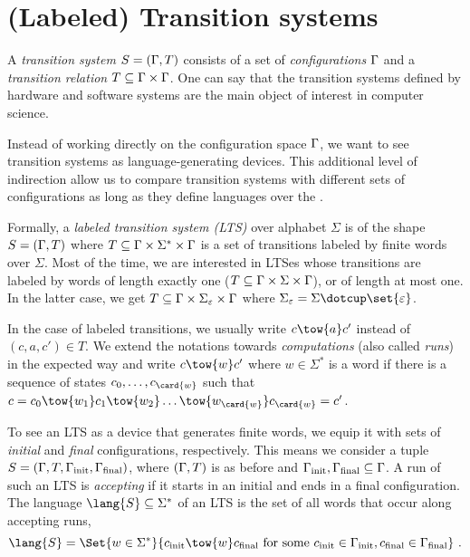 \documentclass[../../diss.tex]{subfiles}
\begin{document}
\section{(Labeled) Transition systems}%
\label{Section:LTS}%

A \emph{transition system} $S = (\Gamma,T)$ consists of a set of \emph{configurations} $\Gamma$ and a \emph{transition relation} $T \subseteq \Gamma \times \Gamma$.
One can say that the transition systems defined by hardware and software systems are the main object of interest in computer science.

Instead of working directly on the configuration space $\Gamma$, we want to see transition systems as language-generating devices.
This additional level of indirection allow us to compare transition systems with different sets of configurations as long as they define languages over the .

Formally, a \emph{labeled transition system (LTS)} over alphabet $\Sigma$ is of the shape $S = (\Gamma,T)$ where $T \subseteq \Gamma \times \Sigma^* \times \Gamma$ is a set of transitions labeled by finite words over $\Sigma$.
Most of the time, we are interested in LTSes whose transitions are labeled by words of length exactly one (\ie $T \subseteq \Gamma \times \Sigma \times \Gamma$), or of length at most one.
In the latter case, we get $T \subseteq \Gamma \times \Sigma_\varepsilon \times \Gamma$ where $\Sigma_\eps = \Sigma \dotcup \set{\eps}$.

In the case of labeled transitions, we usually write $c \tow{a} c'$ instead of $(c,a,c') \in T$.
We extend the notations towards \emph{computations} (also called \emph{runs}) in the expected way and write $c \tow{w} c'$ where $w \in \Sigma^*$ is a word if there is a sequence of states $c_0, \ldots, c_{\card{w}}$ such that $c = c_0 \tow{w_1} c_1 \tow{w_2} \ldots \tow{w_{\card{w}}} c_{\card{w}} = c'$.

To see an LTS as a device that generates finite words, we equip it with sets of \emph{initial} and \emph{final} configurations, respectively.
This means we consider a tuple $S = (\Gamma,T,\Gamma_{\text{init}},\Gamma_{\text{final}})$, where $(\Gamma,T)$ is as before and $\Gamma_{\text{init}}, \Gamma_{\text{final}} \subseteq \Gamma$.
A run of such an LTS is \emph{accepting} if it starts in an initial and ends in a final configuration.
The language $\lang{\lts} \subseteq \Sigma^*$ of an LTS is the set of all words that occur along accepting runs,
\[
    \lang{\lts} = \Set{ w \in \Sigma^*}{c_\init \tow{w} c_\final \text{ for some } c_\init \in \configs_\init, c_\final \in \configs_\final}
    \ .
\]
\end{document}
